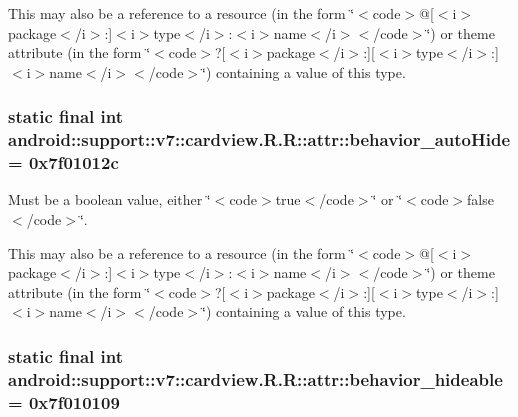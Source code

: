 This may also be a reference to a resource (in the form \char`\"{}$<$code$>$@\mbox{[}$<$i$>$package$<$/i$>$:\mbox{]}$<$i$>$type$<$/i$>$:$<$i$>$name$<$/i$>$$<$/code$>$\char`\"{}) or theme attribute (in the form \char`\"{}$<$code$>$?\mbox{[}$<$i$>$package$<$/i$>$:\mbox{]}\mbox{[}$<$i$>$type$<$/i$>$:\mbox{]}$<$i$>$name$<$/i$>$$<$/code$>$\char`\"{}) containing a value of this type. \hypertarget{classandroid_1_1support_1_1v7_1_1cardview_1_1_r_1_1attr_f3834bc5c0a995d62b508331faecaa4b}{
\subsubsection[{behavior\_\-autoHide}]{\setlength{\rightskip}{0pt plus 5cm}static final int android::support::v7::cardview.R.R::attr::behavior\_\-autoHide = 0x7f01012c}}
\label{classandroid_1_1support_1_1v7_1_1cardview_1_1_r_1_1attr_f3834bc5c0a995d62b508331faecaa4b}


Must be a boolean value, either \char`\"{}$<$code$>$true$<$/code$>$\char`\"{} or \char`\"{}$<$code$>$false$<$/code$>$\char`\"{}. 

This may also be a reference to a resource (in the form \char`\"{}$<$code$>$@\mbox{[}$<$i$>$package$<$/i$>$:\mbox{]}$<$i$>$type$<$/i$>$:$<$i$>$name$<$/i$>$$<$/code$>$\char`\"{}) or theme attribute (in the form \char`\"{}$<$code$>$?\mbox{[}$<$i$>$package$<$/i$>$:\mbox{]}\mbox{[}$<$i$>$type$<$/i$>$:\mbox{]}$<$i$>$name$<$/i$>$$<$/code$>$\char`\"{}) containing a value of this type. \hypertarget{classandroid_1_1support_1_1v7_1_1cardview_1_1_r_1_1attr_71bc7c18f1799813a73505fb4bfda361}{
\subsubsection[{behavior\_\-hideable}]{\setlength{\rightskip}{0pt plus 5cm}static final int android::support::v7::cardview.R.R::attr::behavior\_\-hideable = 0x7f010109}}
\label{classandroid_1_1support_1_1v7_1_1cardview_1_1_r_1_1attr_71bc7c18f1799813a73505fb4bfda361}


